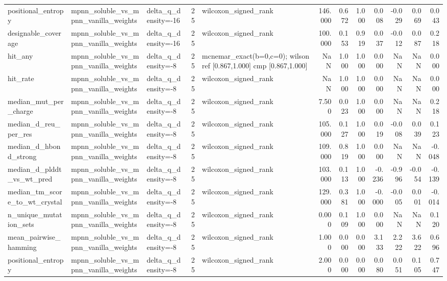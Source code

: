 \begin{table}
{\begin{tabular}{lllrlrrrrrrr}
positional\_entropy & mpnn\_soluble\_vs\_mpnn\_vanilla\_weights & delta\_q\_density=-16 & 25 & wilcoxon\_signed\_rank & 146.000 & 0.672 & 1.000 & 0.008 & -0.029 & 0.069 & 0.043 \\
designable\_coverage & mpnn\_soluble\_vs\_mpnn\_vanilla\_weights & delta\_q\_density=-16 & 25 & wilcoxon\_signed\_rank & 100.000 & 0.153 & 0.919 & 0.037 & -0.012 & 0.087 & 0.218 \\
hit\_any & mpnn\_soluble\_vs\_mpnn\_vanilla\_weights & delta\_q\_density=-8 & 25 & mcnemar\_exact(b=0,c=0); wilson ref [0.867,1.000] cmp [0.867,1.000] & NaN & 1.000 & 1.000 & 0.000 & NaN & NaN & 0.000 \\
hit\_rate & mpnn\_soluble\_vs\_mpnn\_vanilla\_weights & delta\_q\_density=-8 & 25 & wilcoxon\_signed\_rank & NaN & 1.000 & 1.000 & 0.000 & NaN & NaN & 0.000 \\
median\_mut\_per\_charge & mpnn\_soluble\_vs\_mpnn\_vanilla\_weights & delta\_q\_density=-8 & 25 & wilcoxon\_signed\_rank & 7.500 & 0.023 & 1.000 & 0.000 & NaN & NaN & 0.218 \\
median\_d\_reu\_per\_res & mpnn\_soluble\_vs\_mpnn\_vanilla\_weights & delta\_q\_density=-8 & 25 & wilcoxon\_signed\_rank & 105.000 & 0.127 & 1.000 & 0.019 & -0.008 & 0.039 & 0.123 \\
median\_d\_hbond\_strong & mpnn\_soluble\_vs\_mpnn\_vanilla\_weights & delta\_q\_density=-8 & 25 & wilcoxon\_signed\_rank & 109.000 & 0.819 & 1.000 & 0.000 & NaN & NaN & -0.048 \\
median\_d\_plddt\_vs\_wt\_pred & mpnn\_soluble\_vs\_mpnn\_vanilla\_weights & delta\_q\_density=-8 & 25 & wilcoxon\_signed\_rank & 103.000 & 0.113 & 1.000 & -0.236 & -0.996 & -0.054 & -0.139 \\
median\_tm\_score\_to\_wt\_crystal & mpnn\_soluble\_vs\_mpnn\_vanilla\_weights & delta\_q\_density=-8 & 25 & wilcoxon\_signed\_rank & 129.000 & 0.381 & 1.000 & -0.000 & -0.005 & 0.001 & -0.014 \\
n\_unique\_mutation\_sets & mpnn\_soluble\_vs\_mpnn\_vanilla\_weights & delta\_q\_density=-8 & 25 & wilcoxon\_signed\_rank & 0.000 & 0.109 & 1.000 & 0.000 & NaN & NaN & 0.120 \\
mean\_pairwise\_hamming & mpnn\_soluble\_vs\_mpnn\_vanilla\_weights & delta\_q\_density=-8 & 25 & wilcoxon\_signed\_rank & 1.000 & 0.000 & 0.000 & 3.133 & 2.222 & 3.622 & 0.696 \\
positional\_entropy & mpnn\_soluble\_vs\_mpnn\_vanilla\_weights & delta\_q\_density=-8 & 25 & wilcoxon\_signed\_rank & 2.000 & 0.000 & 0.000 & 0.080 & 0.051 & 0.105 & 0.747 \\

\end{tabular}}
\end{table}
